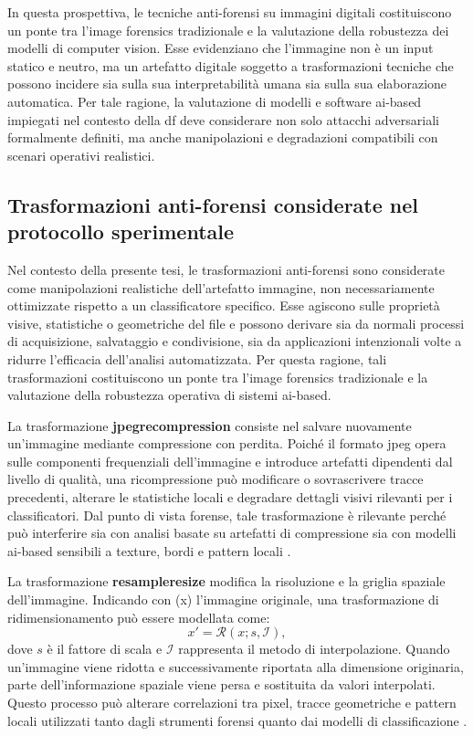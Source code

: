 In questa prospettiva, le tecniche anti-forensi su immagini digitali costituiscono un ponte tra l'image forensics tradizionale e la valutazione della robustezza dei modelli di computer vision. Esse evidenziano che l'immagine non è un input statico e neutro, ma un artefatto digitale soggetto a trasformazioni tecniche che possono incidere sia sulla sua interpretabilità umana sia sulla sua elaborazione automatica. Per tale ragione, la valutazione di modelli e software \gls{ai}-based impiegati nel contesto della \gls{df} deve considerare non solo attacchi adversariali formalmente definiti, ma anche manipolazioni e degradazioni compatibili con scenari operativi realistici.

\subsection{Trasformazioni anti-forensi considerate nel protocollo sperimentale}
\label{subsec:background_antiforensic_transformations}

Nel contesto della presente tesi, le trasformazioni anti-forensi sono considerate
come manipolazioni realistiche dell'artefatto immagine, non necessariamente
ottimizzate rispetto a un classificatore specifico. Esse agiscono sulle proprietà
visive, statistiche o geometriche del file e possono derivare sia da normali
processi di acquisizione, salvataggio e condivisione, sia da applicazioni
intenzionali volte a ridurre l'efficacia dell'analisi automatizzata. Per questa
ragione, tali trasformazioni costituiscono un ponte tra l'image forensics
tradizionale e la valutazione della robustezza operativa di sistemi
\gls{ai}-based.


La trasformazione \textbf{\gls{jpegrecompression}} consiste nel salvare nuovamente
un'immagine mediante compressione con perdita. Poiché il formato \gls{jpeg} opera
sulle componenti frequenziali dell'immagine e introduce artefatti dipendenti dal
livello di qualità, una ricompressione può modificare o sovrascrivere tracce
precedenti, alterare le statistiche locali e degradare dettagli visivi rilevanti
per i classificatori. Dal punto di vista forense, tale trasformazione è rilevante
perché può interferire sia con analisi basate su artefatti di compressione sia
con modelli \gls{ai}-based sensibili a texture, bordi e pattern locali
\cite{stamm2010anti,stamm2013information}.

La trasformazione \textbf{\gls{resampleresize}} modifica la risoluzione e la griglia
spaziale dell'immagine. Indicando con (x) l'immagine originale, una trasformazione
di ridimensionamento può essere modellata come:
\[
x' = \mathcal{R}(x; s, \mathcal{I}),
\]
dove \(s\) è il fattore di scala e \(\mathcal{I}\) rappresenta il metodo di
interpolazione. Quando un'immagine viene ridotta e successivamente riportata
alla dimensione originaria, parte dell'informazione spaziale viene persa e
sostituita da valori interpolati. Questo processo può alterare correlazioni tra
pixel, tracce geometriche e pattern locali utilizzati tanto dagli strumenti
forensi quanto dai modelli di classificazione \cite{popescu2005exposing,farid2016photo}.


